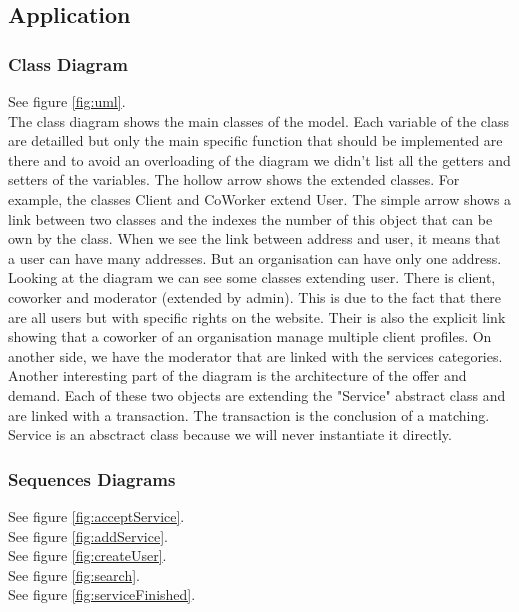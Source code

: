 \subsection{Application} %

\subsubsection{Class Diagram} %
See figure \vref{fig:uml}.\\
The class diagram shows the main classes of the model. Each variable of the class are detailled but only the main specific function that should be implemented are there and to avoid an overloading of the diagram we didn't list all the getters and setters of the variables. The hollow arrow shows the extended classes. For example, the classes Client and CoWorker extend User. The simple arrow shows a link between two classes and the indexes the number of this object that can be own by the class. When we see the link between address and user, it means that a user can have many addresses. But an organisation can have only one address.\\
Looking at the diagram we can see some classes extending user. There is client, coworker and moderator (extended by admin). This is due to the fact that there are all users but with specific rights on the website. Their is also the explicit link showing that a coworker of an organisation manage multiple client profiles. On another side, we have the moderator that are linked with the services categories. Another interesting part of the diagram is the architecture of the offer and demand. Each of these two objects are extending the "Service" abstract class and are linked with a transaction. The transaction is the conclusion of a matching. Service is an absctract class because we will never instantiate it directly.


\subsubsection{Sequences Diagrams} %

See figure \vref{fig:acceptService}.\\
See figure \vref{fig:addService}.\\
See figure \vref{fig:createUser}.\\
See figure \vref{fig:search}.\\
See figure \vref{fig:serviceFinished}.

